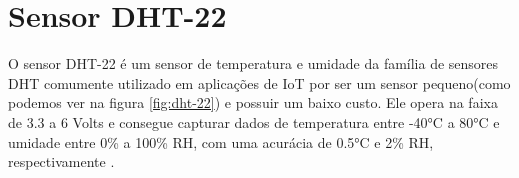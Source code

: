 


\section{Sensor DHT-22}
\label{fund:dht-22}
O sensor DHT-22 é um sensor de temperatura e umidade da família de sensores DHT comumente utilizado em aplicações de IoT por ser um sensor pequeno(como podemos ver na figura \ref{fig:dht-22}) e possuir um baixo custo. Ele opera na faixa de 3.3 a 6 Volts e consegue capturar dados de temperatura entre -40°C a 80°C e umidade entre 0\% a 100\% RH, com uma acurácia de 0.5°C e 2\% RH, respectivamente \cite{datasheetDHT22}.

